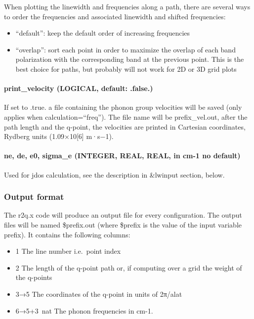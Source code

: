 \documentclass[
]{article}
\providecommand{\tightlist}{%
  \setlength{\itemsep}{0pt}\setlength{\parskip}{0pt}}
\begin{document}
When plotting the linewidth and frequencies along a path, there are
several ways to order the frequencies and associated linewidth and
shifted frequencies:

\begin{itemize}
\tightlist
\item
  \enquote{default}: keep the default order of increasing frequencies
\item
  \enquote{overlap}: sort each point in order to maximize the overlap of
  each band polarization with the corresponding band at the previous
  point. This is the best choice for paths, but probably will not work
  for 2D or 3D grid plots
\end{itemize}

\hypertarget{print_velocity-logical-default-.false.}{%
\paragraph{print\_velocity (LOGICAL, default:
.false.)}\label{print_velocity-logical-default-.false.}}

If set to .true. a file containing the phonon group velocities will be
saved (only applies when calculation=\enquote{freq}). The file name will
be prefix\_vel.out, after the path length and the q-point, the
velocities are printed in Cartesian coordinates, Rydberg units
(1.09×10{[}6{]} m·s−1).

\hypertarget{ne-de-e0-sigma_e-integer-real-real-in-cm-1-no-default}{%
\paragraph{ne, de, e0, sigma\_e (INTEGER, REAL, REAL, in cm-1 no
default)}\label{ne-de-e0-sigma_e-integer-real-real-in-cm-1-no-default}}

Used for jdos calculation, see the description in \&lwinput section,
below.

\hypertarget{output-format}{%
\subsubsection{Output format}\label{output-format}}

The r2q.x code will produce an output file for every configuration. The
output files will be named \$prefix.out (where \$prefix is the value of
the input variable prefix). It contains the following columns:

\begin{itemize}
\tightlist
\item
  1 The line number i.e.~point index
\item
  2 The length of the q-point path or, if computing over a grid the
  weight of the q-points
\item
  3→5 The coordinates of the q-point in units of 2π/alat
\item
  6→5+3~nat The phonon frequencies in cm-1.
\end{itemize}
\end{document}
